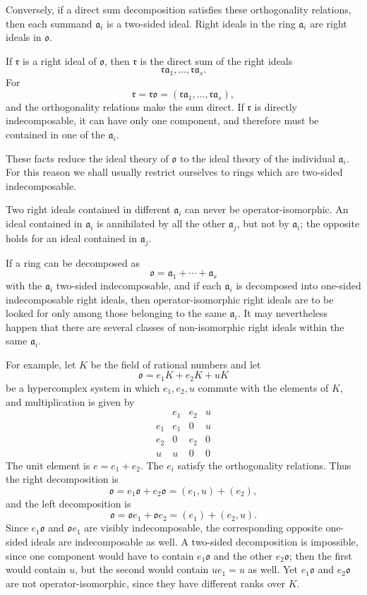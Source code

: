 \documentclass[
  11pt,
]{article}
\begin{document}
Conversely, if a direct sum decomposition satisfies these orthogonality
relations, then each summand \(\mathfrak a_i\) is a two-sided ideal.
Right ideals in the ring \(\mathfrak a_i\) are right ideals in
\(\mathfrak{o}\).

If \(\mathfrak r\) is a right ideal of \(\mathfrak{o}\), then
\(\mathfrak r\) is the direct sum of the right ideals \[
  \mathfrak r\mathfrak a_1,\ldots,\mathfrak r\mathfrak a_s.
\] For \[
  \mathfrak r=\mathfrak r\mathfrak{o}=(\mathfrak r\mathfrak a_1,\ldots,\mathfrak r\mathfrak a_s),
\] and the orthogonality relations make the sum direct. If
\(\mathfrak r\) is directly indecomposable, it can have only one
component, and therefore must be contained in one of the
\(\mathfrak a_i\).

These facts reduce the ideal theory of \(\mathfrak{o}\) to the ideal
theory of the individual \(\mathfrak a_i\). For this reason we shall
usually restrict ourselves to rings which are two-sided indecomposable.

Two right ideals contained in different \(\mathfrak a_i\) can never be
operator-isomorphic. An ideal contained in \(\mathfrak a_i\) is
annihilated by all the other \(\mathfrak a_j\), but not by
\(\mathfrak a_i\); the opposite holds for an ideal contained in
\(\mathfrak a_j\).

If a ring can be decomposed as \[
  \mathfrak{o}=\mathfrak a_1+\cdots+\mathfrak a_s
\] with the \(\mathfrak a_i\) two-sided indecomposable, and if each
\(\mathfrak a_i\) is decomposed into one-sided indecomposable right
ideals, then operator-isomorphic right ideals are to be looked for only
among those belonging to the same \(\mathfrak a_i\). It may nevertheless
happen that there are several classes of non-isomorphic right ideals
within the same \(\mathfrak a_i\).

For example, let \(K\) be the field of rational numbers and let \[
  \mathfrak{o}=e_1K+e_2K+uK
\] be a hypercomplex system in which \(e_1,e_2,u\) commute with the
elements of \(K\), and multiplication is given by \[
\begin{array}{c|ccc}
       & e_1&e_2&u\\ \hline
 e_1   & e_1&0&u\\
 e_2   & 0&e_2&0\\
 u     & u&0&0
\end{array}
\] The unit element is \(e=e_1+e_2\). The \(e_i\) satisfy the
orthogonality relations. Thus the right decomposition is \[
  \mathfrak{o}=e_1\mathfrak{o}+e_2\mathfrak{o}=(e_1,u)+(e_2),
\] and the left decomposition is \[
  \mathfrak{o}=\mathfrak{o}e_1+\mathfrak{o}e_2=(e_1)+(e_2,u).
\] Since \(e_1\mathfrak{o}\) and \(\mathfrak{o}e_1\) are visibly
indecomposable, the corresponding opposite one-sided ideals are
indecomposable as well. A two-sided decomposition is impossible, since
one component would have to contain \(e_1\mathfrak{o}\) and the other
\(e_2\mathfrak{o}\); then the first would contain \(u\), but the second
would contain \(ue_1=u\) as well. Yet \(e_1\mathfrak{o}\) and
\(e_2\mathfrak{o}\) are not operator-isomorphic, since they have
different ranks over \(K\).
\end{document}
